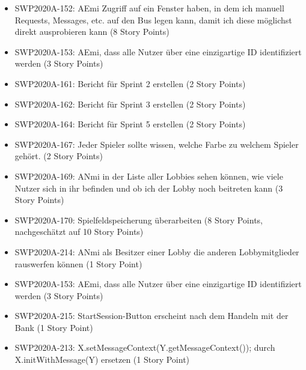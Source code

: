\documentclass[12pt,a4paper, oneside]{article}
\begin{document}
\begin{itemize}
\item SWP2020A-152: AEmi Zugriff auf ein Fenster haben, in dem ich manuell Requests, Messages, etc. auf den Bus legen kann, damit ich diese möglichst direkt ausprobieren kann (8 Story Points)

\item SWP2020A-153: AEmi, dass alle Nutzer über eine einzigartige ID identifiziert werden (3 Story Points)

\item SWP2020A-161: Bericht für Sprint 2 erstellen (2 Story Points)

\item SWP2020A-162: Bericht für Sprint 3 erstellen (2 Story Points)

\item SWP2020A-164: Bericht für Sprint 5 erstellen (2 Story Points)

\item SWP2020A-167: Jeder Spieler sollte wissen, welche Farbe zu welchem Spieler gehört. (2 Story Points)

\item SWP2020A-169: ANmi in der Liste aller Lobbies sehen können, wie viele Nutzer sich in ihr befinden und ob ich der Lobby noch beitreten kann (3 Story Points)

\item SWP2020A-170: Spielfeldspeicherung überarbeiten (8 Story Points, nachgeschätzt auf 10 Story Points)

\item SWP2020A-214: ANmi als Besitzer einer Lobby die anderen Lobbymitglieder rauswerfen können (1 Story Point)

\item SWP2020A-153: AEmi, dass alle Nutzer über eine einzigartige ID identifiziert werden (3 Story Points)

\item SWP2020A-215: StartSession-Button erscheint nach dem Handeln mit der Bank (1 Story Point)

\item SWP2020A-213: X.setMessageContext(Y.getMessageContext()); durch X.initWithMessage(Y) ersetzen (1 Story Point)

\end{itemize}

\newpage
\end{document}

